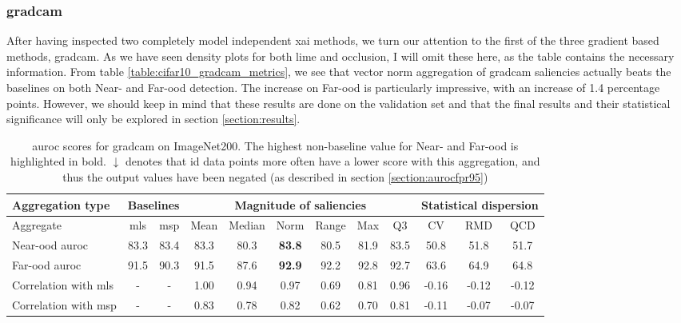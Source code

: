 \documentclass[UKenglish]{uiomasterthesis} %
\theoremstyle{definition}
\begin{document}
\subsubsection{\ac{gradcam}}

After having inspected two completely model independent \ac{xai} methods, we turn our attention to the first of the three gradient based methods, \ac{gradcam}. As we have seen density plots for both \ac{lime} and occlusion, I will omit these here, as the table contains the necessary information. From table \ref{table:cifar10_gradcam_metrics}, we see that vector norm aggregation of \ac{gradcam} saliencies actually beats the baselines on both Near- and Far-\ac{ood} detection. The increase on Far-\ac{ood} is particularly impressive, with an increase of 1.4 percentage points. However, we should keep in mind that these results are done on the validation set and that the final results and their statistical significance will only be explored in section \ref{section:results}.

\begin{table}[H]
\setlength\tabcolsep{3pt}
\begin{center}
\begin{tabular}{ |p{5.1em}|c c|c c c c c c|c c c| }
    \hline
     \centering Aggregation type & \multicolumn{2}{c|}{Baselines} & \multicolumn{6}{c|}{Magnitude of saliencies} & \multicolumn{3}{p{8em}|}{\centering Statistical dispersion} \\
    \hline
    Aggregate & \ac{mls} & \ac{msp} & Mean & Median & Norm & Range & Max & Q3 & CV & RMD & QCD  \\
    \hline
    \rowcolor{near!50}
    Near-\ac{ood} \ac{auroc} & 83.3 & 83.4 & 83.3 & 80.3 &\textbf{ 83.8 }& 80.5 & 81.9 & 83.5 & 50.8 & 51.8 & 51.7  \\
    \hline
    \rowcolor{far!50}
    Far-\ac{ood} \ac{auroc} & 91.5 & 90.3 & 91.5 & 87.6 &\textbf{ 92.9 }& 92.2 & 92.8 & 92.7 & 63.6 & 64.9 & 64.8  \\
    \hline
    Correlation with \ac{mls}& - & - & 1.00 & 0.94 & 0.97 & 0.69 & 0.81 & 0.96 & -0.16 & -0.12 & -0.12  \\
    \hline
    Correlation with \ac{msp}& - & - & 0.83 & 0.78 & 0.82 & 0.62 & 0.70 & 0.81 & -0.11 & -0.07 & -0.07  \\
    \hline
    \end{tabular}
    \caption[\ac{auroc} scores for \ac{gradcam} on ImageNet200]{\ac{auroc} scores for \ac{gradcam} on ImageNet200. The highest non-baseline value for Near- and Far-\ac{ood} is highlighted in bold. $\downarrow$ denotes that \ac{id} data points more often have a lower score with this aggregation, and thus the output values have been negated (as described in section \ref{section:aurocfpr95})}
    \label{table:imagenet200_gradcam_metrics}
\end{center}
\setlength\tabcolsep{6pt}
\end{table}
\end{document}
